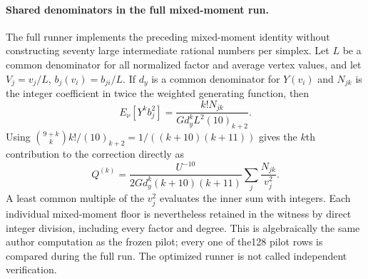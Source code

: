 \paragraph{Shared denominators in the full mixed-moment run.}
The full runner implements the preceding mixed-moment identity without
constructing seventy large intermediate rational numbers per simplex.
Let $L$ be a common denominator for all normalized factor and average
vertex values, and let $V_j=v_j/L$, $b_j(v_i)=b_{ji}/L$.
If $d_y$ is a common denominator for $Y(v_i)$ and $N_{jk}$ is the
integer coefficient in twice the weighted generating function, then
\[
 E_\nu[Y^k b_j^2]=\frac{k!N_{jk}}{Gd_y^kL^2(10)_{k+2}}.
\]
Using
$\binom{9+k}{k}k!/(10)_{k+2}=1/((k+10)(k+11))$ gives the $k$th
contribution to the correction directly as
\[
 Q^{(k)}=\frac{U^{-10}}{2Gd_y^k(k+10)(k+11)}
                       \sum_j\frac{N_{jk}}{v_j^2}.
\]
A least common multiple of the $v_j^2$ evaluates the inner sum with
integers. Each individual mixed-moment floor is nevertheless retained
in the witness by direct integer division, including every factor and
degree. This is algebraically the same author computation as the frozen
pilot; every one of the128 pilot rows is compared during the full run.
The optimized runner is not called independent verification.
